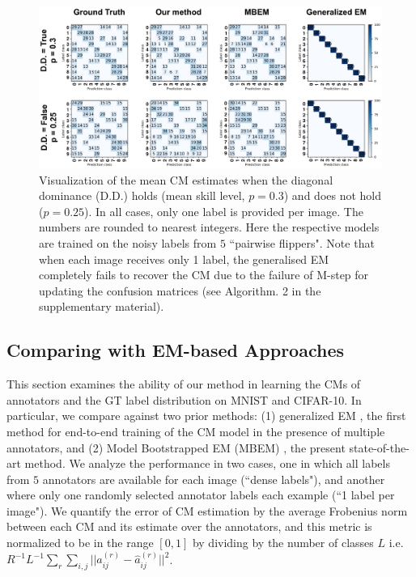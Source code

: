 \begin{figure}[t]
	\center
	\includegraphics[width=\linewidth]{chapter_4/figures/figures_new/figure_4.png}
	\caption{\small Visualization of the mean CM estimates when the diagonal dominance (D.D.) holds (mean skill level, $p=0.3$) and does not hold ($p=0.25$). In all cases, only one label is provided per image. The numbers are rounded to nearest integers. Here the respective models are trained on the noisy labels from $5$ ``pairwise flippers". Note that when each image receives only 1 label, the generalised EM \cite{raykar2009supervised} completely fails to recover the CM due to the failure of M-step for updating the confusion matrices (see Algorithm. 2 in the supplementary material). }
	\label{fig:diagonal_dominance_violation}
\end{figure}





\subsection{Comparing with EM-based Approaches} \label{sec:comparison_with_em}
This section examines the ability of our method in learning the CMs of annotators and the GT label distribution on MNIST and CIFAR-10. In particular, we compare against two prior methods: (1) generalized EM \cite{raykar2010learning}, the first method for end-to-end training of the CM model in the presence of multiple annotators, and (2) Model Bootstrapped EM (MBEM) \cite{khetan2017learning}, the present state-of-the-art method. We analyze the performance in two cases, one in which all labels from $5$ annotators are available for each image (``dense labels"), and another where only one randomly selected annotator labels each example (``1 label per image"). We quantify the error of CM estimation by the average Frobenius norm between each CM and its estimate over the annotators, and this metric is normalized to be in the range $[0,1]$ by dividing by the number of classes $L$ i.e. $R^{-1}L^{-1}\sum_{r}\sum_{i,j}||a^{(r)}_{ij}-\hat{a}^{(r)}_{ij}||^2$.



